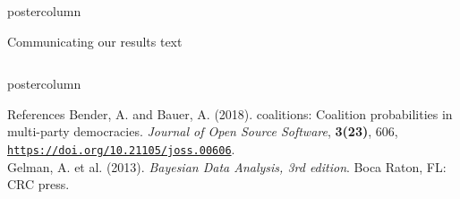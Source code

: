 \documentclass[final,hyperref={pdfpagelabels=false}]{beamer}
\newcommand*\circled[1]{\tikz[baseline=(char.base)]{
\node[shape=circle,draw,inner sep=2pt] (char) {#1};}}
\begin{document}
\begin{frame}
\begin{columns}
\begin{column}{1\textwidth}
\begin{columns}[T]
\begin{column}{.484\textwidth}
\begin{beamercolorbox}[center,wd=\textwidth]{postercolumn}
\begin{minipage}[T]{.95\textwidth}
\begin{block}{\footnotesize \circled{4} Communicating our results}
text
\end{block}


\end{minipage}
\end{beamercolorbox}
\end{column}

\begin{column}{.016\textwidth}
\end{column}

\end{columns}


\vspace{2ex}
\begin{beamercolorbox}[center,wd=\textwidth]{postercolumn}
\begin{minipage}[T]{.95\textwidth}  %
\begin{block}{\footnotesize References}
{\footnotesize
Bender, A. and Bauer, A. (2018). coalitions: Coalition probabilities in multi-party democracies.
\textit{Journal of Open Source Software}, \textbf{3(23)}, 606,
\href{https://doi.org/10.21105/joss.00606}{\texttt{https://doi.org/10.21105/joss.00606}}. \\
Gelman, A. et al. (2013). \textit{Bayesian Data Analysis, 3rd edition}. Boca Raton, FL: CRC press.
}
\end{block}
\end{minipage}
\end{beamercolorbox}

\end{column} %
\end{columns}
\end{frame}
\end{document}
